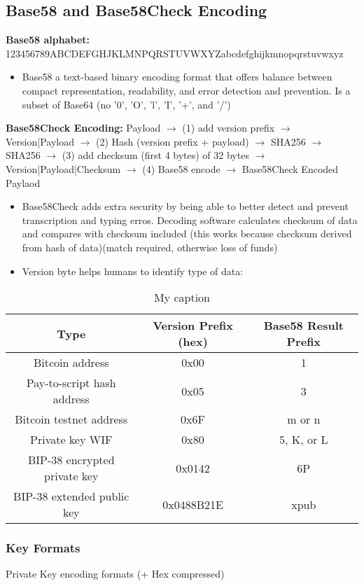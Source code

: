 \documentclass[english, 11pt]{article}
\begin{document}
\subsection{Base58 and Base58Check Encoding}
\textbf{Base58 alphabet:} 123456789ABCDEFGHJKLMNPQRSTUVWXYZabcdefghijkmnopqrstuvwxyz
\begin{itemize}
    \item Base58 a text-based binary encoding format that offers balance between compact representation, readability, and error detection and prevention. Is a subset of Base64 (no '0', 'O', 'l', 'I', '+', and '/')
\end{itemize}
\textbf{Base58Check Encoding:} Payload $\rightarrow$ (1) add version prefix $\rightarrow$ Version|Payload $\rightarrow$ (2) Hash (version prefix + payload) $\rightarrow$ SHA256 $\rightarrow$ SHA256 $\rightarrow$ (3) add checksum (first 4 bytes) of 32 bytes $\rightarrow$ Version|Payload|Checksum $\rightarrow$ (4) Base58 encode $\rightarrow$ Base58Check Encoded Paylaod
\begin{itemize}
    \item Base58Check adds extra security by being able to better detect and prevent transcription and typing erros. Decoding software calculates checksum of data and compares with checksum included (this works because checksum derived from hash of data)(match required, otherwise loss of funds)
    \item Version byte helps humans to identify type of data:
\end{itemize}
\begin{table}[]
\centering
\caption{My caption}
\label{my-label}
\begin{tabular}{|c|c|c|}
\hline
\textbf{Type} & \textbf{Version Prefix (hex)} & \textbf{Base58 Result Prefix} \\ \hline
Bitcoin address & 0x00 & 1 \\ \hline
Pay-to-script hash address & 0x05 & 3 \\ \hline
Bitcoin testnet address & 0x6F & m or n \\ \hline
Private key WIF & 0x80 & 5, K, or L \\ \hline
BIP-38 encrypted private key & 0x0142 & 6P \\ \hline
BIP-38 extended public key & 0x0488B21E & xpub \\ \hline
\end{tabular}
\end{table}

\subsubsection{Key Formats}
Private Key encoding formats (+ Hex compressed)
\end{document}
